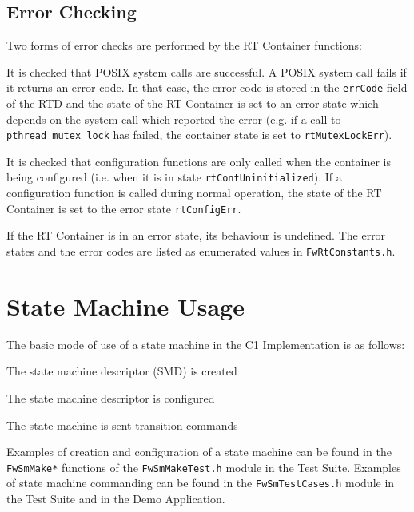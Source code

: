 \documentclass[manual]{../fwprofile}
\begin{document}
\subsection{Error Checking}\label{sec:rtErrChecking}
Two forms of error checks are performed by the RT Container functions:
\begin{fw_enumerate}
\item It is checked that POSIX system calls are successful. A POSIX system call fails if it returns an error code. In that case, the error code is stored in the \texttt{errCode} field of the RTD and the state of the RT Container is set to an error state which depends on the system call which reported the error (e.g. if a call to \texttt{pthread\_mutex\_lock} has failed, the container state is set to \texttt{rtMutexLockErr}).
\item It is checked that configuration functions are only called when the container is being configured (i.e. when it is in state \texttt{rtContUninitialized}). If a configuration function is called during normal operation, the state of the RT Container is set to the error state \texttt{rtConfigErr}.
\end{fw_enumerate} 

If the RT Container is in an error state, its behaviour is undefined. The error states and the error codes are listed as enumerated values in \texttt{FwRtConstants.h}.

\section{State Machine Usage}\label{sec:smUsage} 

The basic mode of use of a state machine in the C1 Implementation is as follows:

\begin{fw_itemize}
\item The state machine descriptor (SMD) is created
\item The state machine descriptor is configured
\item The state machine is sent transition commands
\end{fw_itemize}

Examples of creation and configuration of a state machine can be found in the \texttt{FwSmMake*} functions of 
the \texttt{FwSmMakeTest.h} module in the Test Suite. Examples of state machine commanding can be found in the 
\texttt{FwSmTestCases.h} module in the Test Suite and in the Demo Application.
\end{document}
